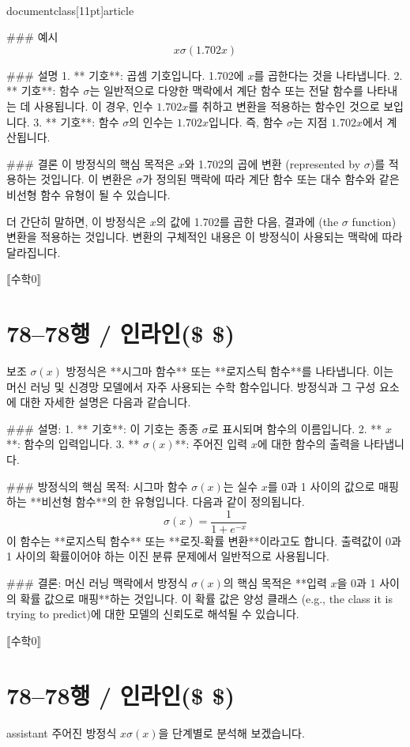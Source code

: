 \\documentclass[11pt]{article}
\begin{document}
### 예시
\[ x \sigma(1.702 x) \]

### 설명
1. ** 기호**: 곱셈 기호입니다. 1.702에 \( x \)를 곱한다는 것을 나타냅니다.
2. ** 기호**: 함수 \(\sigma\)는 일반적으로 다양한 맥락에서 계단 함수 또는 전달 함수를 나타내는 데 사용됩니다. 이 경우, 인수 \(1.702 x\)를 취하고 변환을 적용하는 함수인 것으로 보입니다.
3. ** 기호**: 함수 \(\sigma\)의 인수는 \(1.702 x\)입니다. 즉, 함수 \(\sigma\)는 지점 \(1.702 x\)에서 계산됩니다.

### 결론
이 방정식의 핵심 목적은 \( x \)와 1.702의 곱에 변환 (represented by \(\sigma\))를 적용하는 것입니다. 이 변환은 \(\sigma\)가 정의된 맥락에 따라 계단 함수 또는 대수 함수와 같은 비선형 함수 유형이 될 수 있습니다.

더 간단히 말하면, 이 방정식은 \( x \)의 값에 1.702를 곱한 다음, 결과에 (the \(\sigma\) function) 변환을 적용하는 것입니다. 변환의 구체적인 내용은 이 방정식이 사용되는 맥락에 따라 달라집니다.

⟦수학0⟧

\section*{78–78행 / 인라인(\$ \$)}
보조
\(\sigma(x)\) 방정식은 **시그마 함수** 또는 **로지스틱 함수**를 나타냅니다. 이는 머신 러닝 및 신경망 모델에서 자주 사용되는 수학 함수입니다. 방정식과 그 구성 요소에 대한 자세한 설명은 다음과 같습니다.

### 설명:
1. ** 기호**: 이 기호는 종종 \(\sigma\)로 표시되며 함수의 이름입니다.
2. ** \(x\)**: 함수의 입력입니다.
3. ** \(\sigma(x)\)**: 주어진 입력 \(x\)에 대한 함수의 출력을 나타냅니다.

### 방정식의 핵심 목적:
시그마 함수 \(\sigma(x)\)는 실수 \(x\)를 0과 1 사이의 값으로 매핑하는 **비선형 함수**의 한 유형입니다. 다음과 같이 정의됩니다.
\[
\sigma(x) = \frac{1}{1 + e^{-x}}
\]
이 함수는 **로지스틱 함수** 또는 **로짓-확률 변환**이라고도 합니다. 출력값이 0과 1 사이의 확률이어야 하는 이진 분류 문제에서 일반적으로 사용됩니다.

### 결론:
머신 러닝 맥락에서 방정식 \(\sigma(x)\)의 핵심 목적은 **입력 \(x\)을 0과 1 사이의 확률 값으로 매핑**하는 것입니다. 이 확률 값은 양성 클래스 (e.g., the class it is trying to predict)에 대한 모델의 신뢰도로 해석될 수 있습니다.

⟦수학0⟧

\section*{78–78행 / 인라인(\$ \$) }
assistant
주어진 방정식 \( x\sigma(x) \)을 단계별로 분석해 보겠습니다.
\end{document}
